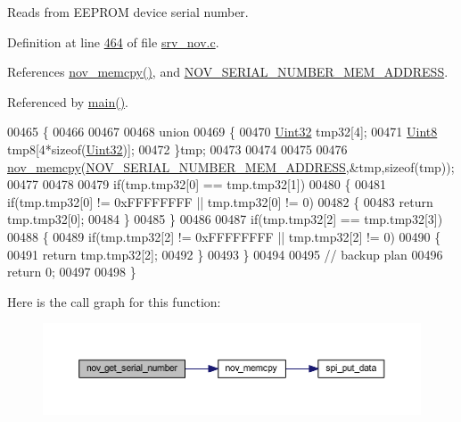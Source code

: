 Reads from E\+E\+P\+R\+O\+M device serial number. 



Definition at line \hyperlink{a00060_source_l00464}{464} of file \hyperlink{a00060_source}{srv\+\_\+nov.\+c}.



References \hyperlink{a00060_source_l00723}{nov\+\_\+memcpy()}, and \hyperlink{a00029_source_l00029}{N\+O\+V\+\_\+\+S\+E\+R\+I\+A\+L\+\_\+\+N\+U\+M\+B\+E\+R\+\_\+\+M\+E\+M\+\_\+\+A\+D\+D\+R\+E\+S\+S}.



Referenced by \hyperlink{a00048_source_l00080}{main()}.


\begin{DoxyCode}
00465 \{
00466 
00467 
00468     \textcolor{keyword}{union}
00469     \{
00470         \hyperlink{a00072_aba99025e657f892beb7ff31cecf64653}{Uint32} tmp32[4];
00471         \hyperlink{a00072_af84840501dec18061d18a68c162a8fa2}{Uint8}  tmp8[4*\textcolor{keyword}{sizeof}(\hyperlink{a00072_aba99025e657f892beb7ff31cecf64653}{Uint32})];
00472     \}tmp;
00473 
00474 
00475 
00476     \hyperlink{a00060_a3ff681f3af83ec441535611dac6ada16}{nov\_memcpy}(\hyperlink{a00029_ab7dc1ea8a7f6e16cf27fbfe88efd7285}{NOV\_SERIAL\_NUMBER\_MEM\_ADDRESS},&tmp,\textcolor{keyword}{sizeof}(tmp));
00477 
00478 
00479     \textcolor{keywordflow}{if}(tmp.tmp32[0] == tmp.tmp32[1])
00480     \{
00481         \textcolor{keywordflow}{if}(tmp.tmp32[0] != 0xFFFFFFFF || tmp.tmp32[0] != 0)
00482         \{
00483             \textcolor{keywordflow}{return}  tmp.tmp32[0];
00484         \}
00485     \}
00486 
00487     \textcolor{keywordflow}{if}(tmp.tmp32[2] == tmp.tmp32[3])
00488     \{
00489         \textcolor{keywordflow}{if}(tmp.tmp32[2] != 0xFFFFFFFF || tmp.tmp32[2] != 0)
00490         \{
00491             \textcolor{keywordflow}{return}  tmp.tmp32[2];
00492         \}
00493     \}
00494 
00495     \textcolor{comment}{// backup plan}
00496     \textcolor{keywordflow}{return} 0;
00497         
00498 \}
\end{DoxyCode}


Here is the call graph for this function\+:
\nopagebreak
\begin{figure}[H]
\begin{center}
\leavevmode
\includegraphics[width=350pt]{d9/d73/a00060_a86b863ea185628aff5a00b4defbbb6e1_cgraph}
\end{center}
\end{figure}




